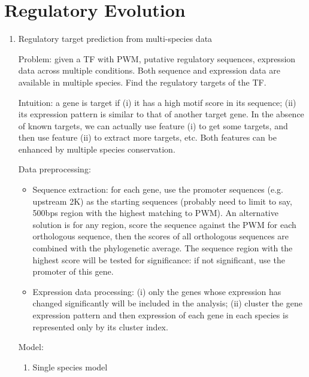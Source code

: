 \documentclass[11pt]{article}
\begin{document}
\section{Regulatory Evolution}
\begin{enumerate}
\item{Regulatory target prediction from multi-species data}

Problem: given a TF with PWM, putative regulatory sequences, expression data across multiple conditions. Both sequence and expression data are available in multiple species. Find the regulatory targets of the TF. 

Intuition: a gene is target if (i) it has a high motif score in its sequence; (ii) its expression pattern is similar to that of another target gene. In the absence of known targets, we can actually use feature (i) to get some targets, and then use feature (ii) to extract more targets, etc. Both features can be enhanced by multiple species conservation. 

Data preprocessing: 
\begin{itemize}
\item Sequence extraction: for each gene, use the promoter sequences (e.g. upstream 2K) as the starting sequences (probably need to limit to say, 500bps region with the highest matching to PWM). An alternative solution is for any region, score the sequence against the PWM for each orthologous sequence, then the scores of all orthologous sequences are combined with the phylogenetic average. The sequence region with the highest score will be tested for significance: if not significant, use the promoter of this gene. 

\item Expression data processing: (i) only the genes whose expression has changed significantly will be included in the analysis; (ii) cluster the gene expression pattern and then expression of each gene in each species is represented only by its cluster index. 
\end{itemize}

Model: 
\begin{enumerate}

\item{Single species model} 


\end{enumerate}
\end{enumerate}
\end{document}

